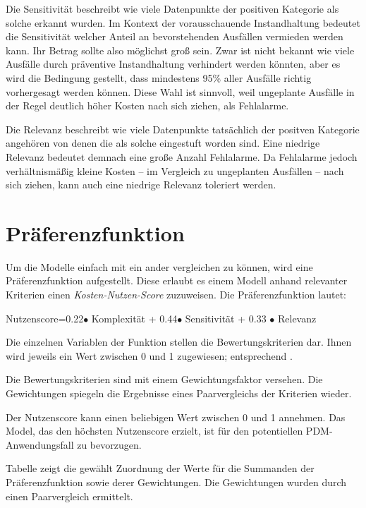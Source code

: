 Die Sensitivität beschreibt wie viele Datenpunkte der positiven Kategorie als solche erkannt wurden. Im Kontext der vorausschauende Instandhaltung bedeutet die Sensitivität welcher Anteil an bevorstehenden Ausfällen vermieden werden kann. Ihr Betrag sollte also möglichst groß sein. Zwar ist nicht bekannt wie viele Ausfälle durch präventive Instandhaltung verhindert werden könnten, aber es wird die Bedingung gestellt, dass mindestens 95\% aller Ausfälle richtig vorhergesagt werden können. Diese Wahl ist sinnvoll, weil ungeplante Ausfälle in der Regel deutlich höher Kosten nach sich ziehen, als Fehlalarme.

Die Relevanz beschreibt wie viele Datenpunkte tatsächlich der positven Kategorie angehören von denen die als solche eingestuft worden sind. Eine niedrige Relevanz bedeutet demnach eine große Anzahl Fehlalarme. Da Fehlalarme jedoch verhältnismäßig kleine Kosten -- im Vergleich zu ungeplanten Ausfällen -- nach sich ziehen, kann auch eine niedrige Relevanz toleriert werden.


\section{Präferenzfunktion}
\label{sec:präferenzfunktion}

Um die Modelle einfach mit ein ander vergleichen zu können, wird eine Präferenzfunktion aufgestellt. Diese erlaubt es einem Modell anhand relevanter Kriterien einen \textit{Kosten-Nutzen-Score} zuzuweisen. Die Präferenzfunktion lautet:
\begin{center}
    Nutzenscore=\num{0,22}$\bullet$ Komplexität + \num{0,44}$\bullet$ Sensitivität + \num{0,33} $\bullet$ Relevanz
\end{center}

Die einzelnen Variablen der Funktion stellen die Bewertungskriterien dar. Ihnen wird jeweils ein Wert zwischen 0 und 1 zugewiesen; entsprechend .

Die Bewertungskriterien sind mit einem Gewichtungsfaktor versehen. Die Gewichtungen spiegeln die Ergebnisse eines Paarvergleichs der Kriterien wieder. 

Der Nutzenscore kann einen beliebigen Wert zwischen 0 und 1 annehmen. Das Model, das den höchsten Nutzenscore erzielt, ist für den potentiellen PDM-Anwendungsfall zu bevorzugen.

Tabelle  zeigt die gewählt Zuordnung der Werte für die Summanden der Präferenzfunktion sowie derer Gewichtungen. Die Gewichtungen wurden durch einen Paarvergleich ermittelt.


